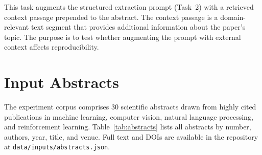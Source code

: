 \documentclass[11pt]{article}
\begin{document}
\noindent This task augments the structured extraction prompt (Task~2) with a retrieved context passage prepended to the abstract. The context passage is a domain-relevant text segment that provides additional information about the paper's topic. The purpose is to test whether augmenting the prompt with external context affects reproducibility.


\section{Input Abstracts}
\label{sec:s2}

The experiment corpus comprises 30 scientific abstracts drawn from highly cited publications in machine learning, computer vision, natural language processing, and reinforcement learning. Table~\ref{tab:abstracts} lists all abstracts by number, authors, year, title, and venue. Full text and DOIs are available in the repository at \texttt{data/inputs/abstracts.json}.
\end{document}
